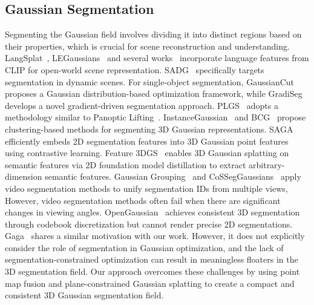 \subsection{Gaussian Segmentation}
Segmenting the Gaussian field involves dividing it into distinct regions based on their properties, which is crucial for scene reconstruction and understanding. LangSplat~\cite{qin2024langsplat}, LEGaussians~\cite{shi2024language} and several works~\cite{chen2024ovgaussian,peng2024gags,liang2024supergseg,hu2024sparselgs,cheng2024occam,peng20243d,qiu2024gls} incorporate language features from CLIP for open-world scene representation. SADG~\cite{li2024sadg} specifically targets segmentation in dynamic scenes. For single-object segmentation, GaussianCut~\cite{jain2024gaussiancut} proposes a Gaussian distribution-based optimization framework, while GradiSeg~\cite{li2024gradiseg} develops a novel gradient-driven segmentation approach. PLGS~\cite{wang2024plgs} adopts a methodology similar to Panoptic Lifting~\cite{siddiqui2023panoptic}. InstanceGaussian~\cite{li2024instancegaussian} and BCG~\cite{zhang2024bootstraping} propose clustering-based methods for segmenting 3D Gaussian representations.
SAGA~\cite{cen2023segment} efficiently embeds 2D segmentation features into 3D Gaussian point features using contrastive learning. Feature 3DGS~\cite{zhou2024feature} enables 3D Gaussian splatting on semantic features via 2D foundation model distillation to extract arbitrary-dimension semantic features. Gaussian Grouping~\cite{ye2023gaussian} and CoSSegGaussians~\cite{dou2024cosseggaussians} apply video segmentation methods to unify segmentation IDs from multiple views, However, video segmentation methods often fail when there are significant changes in viewing angles. OpenGaussian~\cite{wu2024opengaussian} achieves consistent 3D segmentation through codebook discretization but cannot render precise 2D segmentations. Gaga~\cite{lyu2024gaga} shares a similar motivation with our work. However, it does  not explicitly consider the role of segmentation in Gaussian optimization, and the lack of segmentation-constrained optimization can result in meaningless floaters in the 3D segmentation field. Our approach overcomes these challenges by using point map fusion and plane-constrained Gaussian splatting to create a compact and consistent 3D Gaussian segmentation field.